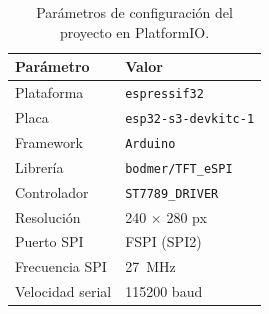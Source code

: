 \documentclass[11pt,a4paper]{article}
\begin{document}
\begin{table}[h!]
\centering
\renewcommand{\arraystretch}{1.3}
\begin{tabular}{ll}
\toprule
\rowcolor{azulESP!15}
\textbf{Parámetro} & \textbf{Valor} \\
\midrule
Plataforma              & \texttt{espressif32} \\
\rowcolor{grisFondo}
Placa                   & \texttt{esp32-s3-devkitc-1} \\
Framework               & \texttt{Arduino} \\
\rowcolor{grisFondo}
Librería                & \texttt{bodmer/TFT\_eSPI} \\
Controlador             & \texttt{ST7789\_DRIVER} \\
\rowcolor{grisFondo}
Resolución              & 240 $\times$ 280 px \\
Puerto SPI              & FSPI (SPI2) \\
\rowcolor{grisFondo}
Frecuencia SPI          & \SI{27}{\mega\hertz} \\
Velocidad serial        & 115200 baud \\
\bottomrule
\end{tabular}
\caption{Parámetros de configuración del proyecto en PlatformIO.}
\label{tab:config}
\end{table}
\end{document}
